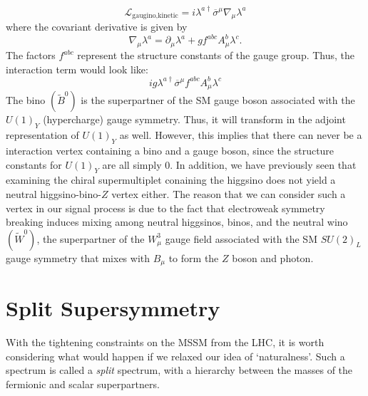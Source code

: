 \[\mathcal{L}_{\text{gaugino,kinetic}} = i\lambda^{a\dagger}\overline{\sigma}^\mu\nabla_\mu\lambda^a\]
where the covariant derivative is given by
\[\nabla_\mu\lambda^a = \partial_\mu\lambda^a + gf^{abc}A_\mu^b\lambda^c.\]
The factors $f^{abc}$ represent the structure constants of the gauge group. Thus, the interaction term would look like:
\[ig\lambda^{a\dagger}\overline{\sigma}^\mu f^{abc}A_\mu^b\lambda^c\]
The bino $(\widetilde{B}^0)$ is the superpartner of the SM gauge boson associated with the $U(1)_Y$ (hypercharge) gauge symmetry. Thus, it will transform in the adjoint representation of $U(1)_Y$ as well. However, this implies that there can never be a interaction vertex containing a bino and a gauge boson, since the structure constants for $U(1)_Y$ are all simply 0. In addition, we have previously seen that examining the chiral supermultiplet conaining the higgsino does not yield a neutral higgsino-bino-$Z$ vertex either. The reason that we can consider such a vertex in our signal process is due to the fact that electroweak symmetry breaking induces mixing among neutral higgsinos, binos, and the neutral wino $(\widetilde{W}^0)$, the superpartner of the $W_\mu^3$ gauge field associated with the SM $SU(2)_L$ gauge symmetry that mixes with $B_\mu$ to form the $Z$ boson and photon.

\section{Split Supersymmetry}
With the tightening constraints on the MSSM from the LHC, it is worth considering what would happen if we relaxed our idea of `naturalness'. Such a spectrum is called a \emph{split} spectrum, with a hierarchy between the masses of the fermionic and scalar superpartners.
